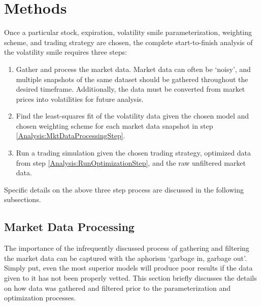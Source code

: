 \documentclass[12pt, a4paper, notitlepage]{article}
\numberwithin{equation}{subsection}
\numberwithin{figure}{subsection}
\numberwithin{table}{subsection}
\begin{document}
\section{Methods}
Once a particular stock, expiration, volatility smile parameterization, weighting scheme, and trading strategy are chosen, the complete start-to-finish analysis of the volatility smile requires three steps:
\begin{enumerate}
	\item Gather and process the market data.  Market data can often be `noisy', and multiple snapshots of the same dataset should be gathered throughout the desired timeframe.  Additionally, the data must be converted from market prices into volatilities for future analysis.\label{Analysis:MktDataProcessingStep}
    \item Find the least-squares fit of the volatility data given the chosen model and chosen weighting scheme for each market data snapshot in step \ref{Analysis:MktDataProcessingStep}. \label{Analysis:RunOptimizationStep}
    \item Run a trading simulation given the chosen trading strategy, optimized data from step \ref{Analysis:RunOptimizationStep}, and the raw unfiltered market data.
\end{enumerate}
Specific details on the above three step process are discussed in the following subsections.

\subsection{Market Data Processing}
\label{subsec:MarketDataProcessing}
The importance of the infrequently discussed process of gathering and filtering the market data can be captured with the aphorism `garbage in, garbage out'.  Simply put, even the most superior models will produce poor results if the data given to it has not been properly vetted.  This section briefly discusses the details on how data was gathered and filtered prior to the parameterization and optimization processes.
\end{document}

